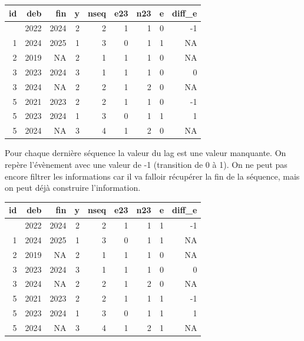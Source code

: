 \documentclass[
  12pt,
  letterpaper,
  DIV=11,
  numbers=noendperiod,
  onepage,
  openany]{scrreprt}
\newenvironment{Shaded}{\begin{snugshade}}{\end{snugshade}}
\newcommand{\AttributeTok}[1]{\textcolor[rgb]{0.80,0.80,0.80}{#1}}
\newcommand{\DecValTok}[1]{\textcolor[rgb]{0.86,0.86,0.80}{#1}}
\newcommand{\FunctionTok}[1]{\textcolor[rgb]{0.94,0.94,0.56}{#1}}
\newcommand{\NormalTok}[1]{\textcolor[rgb]{0.80,0.80,0.80}{#1}}
\newcommand{\OtherTok}[1]{\textcolor[rgb]{0.94,0.94,0.56}{#1}}
\newcommand{\SpecialCharTok}[1]{\textcolor[rgb]{0.86,0.64,0.64}{#1}}
\begin{document}
\begin{longtable}[]{@{}rrrrrrrrr@{}}
\toprule\noalign{}
id & deb & fin & y & nseq & e23 & n23 & e & diff\_e \\
\midrule\noalign{}
\endhead
\bottomrule\noalign{}
\endlastfoot
1 & 2022 & 2024 & 2 & 2 & 1 & 1 & 0 & -1 \\
1 & 2024 & 2025 & 1 & 3 & 0 & 1 & 1 & NA \\
2 & 2019 & NA & 2 & 1 & 1 & 1 & 0 & NA \\
3 & 2023 & 2024 & 3 & 1 & 1 & 1 & 0 & 0 \\
3 & 2024 & NA & 2 & 2 & 1 & 2 & 0 & NA \\
5 & 2021 & 2023 & 2 & 2 & 1 & 1 & 0 & -1 \\
5 & 2023 & 2024 & 1 & 3 & 0 & 1 & 1 & 1 \\
5 & 2024 & NA & 3 & 4 & 1 & 2 & 0 & NA \\
\end{longtable}

Pour chaque dernière séquence la valeur du lag est une valeur manquante.
On repère l'évènement avec une valeur de -1 (transition de 0 à 1). On ne
peut pas encore filtrer les informations car il va falloir récupérer la
fin de la séquence, mais on peut déjà construire l'information.

\begin{Shaded}
\end{Shaded}

\begin{longtable}[]{@{}rrrrrrrrr@{}}
\toprule\noalign{}
id & deb & fin & y & nseq & e23 & n23 & e & diff\_e \\
\midrule\noalign{}
\endhead
\bottomrule\noalign{}
\endlastfoot
1 & 2022 & 2024 & 2 & 2 & 1 & 1 & 1 & -1 \\
1 & 2024 & 2025 & 1 & 3 & 0 & 1 & 1 & NA \\
2 & 2019 & NA & 2 & 1 & 1 & 1 & 0 & NA \\
3 & 2023 & 2024 & 3 & 1 & 1 & 1 & 0 & 0 \\
3 & 2024 & NA & 2 & 2 & 1 & 2 & 0 & NA \\
5 & 2021 & 2023 & 2 & 2 & 1 & 1 & 1 & -1 \\
5 & 2023 & 2024 & 1 & 3 & 0 & 1 & 1 & 1 \\
5 & 2024 & NA & 3 & 4 & 1 & 2 & 1 & NA \\
\end{longtable}
\end{document}
